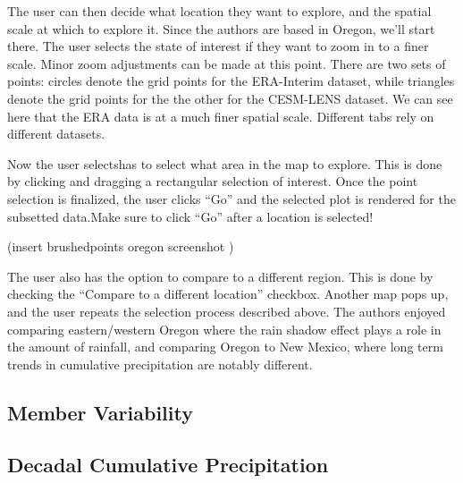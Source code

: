 \documentclass[10pt,letterpaper]{article}
\begin{document}
The user can then decide what location they want to explore, and the spatial scale at which to explore it. Since the authors are based in Oregon, we’ll start there. The user selects the state of interest if they want to zoom in to a finer scale. Minor zoom adjustments can be made at this point. There are two sets of points: circles denote the grid points for the ERA-Interim dataset, while triangles denote the grid points for the the other for the CESM-LENS dataset. We can see here that the ERA data is at a much finer spatial scale. Different tabs rely on different datasets.


Now the user selectshas to select what area in the map to explore. This is done by clicking and dragging a rectangular selection of interest. Once the point selection is finalized, the user clicks “Go” and the selected plot is rendered for the subsetted data.Make sure to click “Go” after a location is selected!

(insert brushedpoints oregon screenshot )

The user also has the option to compare to a different region. This is done by checking the “Compare to a different location” checkbox. Another map pops up, and the user repeats the selection process described above. The authors enjoyed comparing eastern/western Oregon where the rain shadow effect plays a role in the amount of rainfall, and comparing Oregon to New Mexico, where long term trends in cumulative precipitation are notably different.

\subsection*{Member Variability}

\subsection*{Decadal Cumulative Precipitation}
\end{document}
